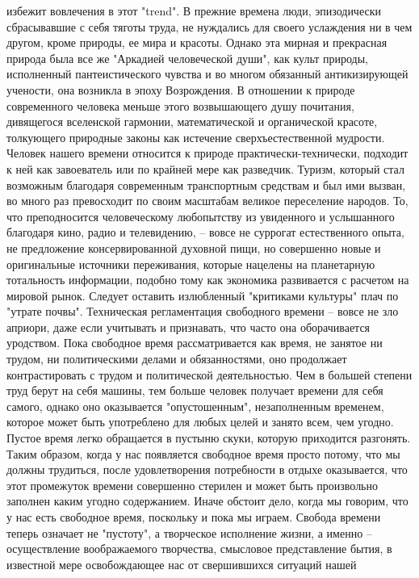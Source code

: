 \documentclass[12pt]{article}
\begin{document}
избежит вовлечения в этот "trend". В прежние времена люди, эпизодически сбрасывавшие с себя тяготы труда,
не нуждались для своего услаждения ни в чем другом, кроме природы, ее мира и красоты. Однако эта мирная и
прекрасная  природа  была  все  же  "Аркадией  человеческой  души",  как  культ  природы,  исполненный
пантеистического  чувства  и  во  многом  обязанный  антикизирующей  учености,  она  возникла  в  эпоху
Возрождения. В отношении к природе современного человека меньше этого возвышающего душу почитания,
дивящегося вселенской гармонии, математической и органической красоте, толкующего природные законы как
истечение  сверхъестественной  мудрости.  Человек  нашего  времени  относится  к  природе  практически-технически,  подходит  к  ней  как  завоеватель  или  по  крайней  мере  как  разведчик.  Туризм,  который  стал
возможным благодаря современным транспортным средствам и был ими вызван, во много раз превосходит по
своим  масштабам  великое  переселение  народов.  То,  что  преподносится  человеческому  любопытству  из
увиденного и услышанного благодаря кино, радио и телевидению, -- вовсе не суррогат естественного опыта, не
предложение  консервированной  духовной  пищи,  но  совершенно  новые  и  оригинальные  источники
переживания,  которые  нацелены  на  планетарную  тотальность  информации,  подобно  тому  как  экономика
развивается с расчетом на мировой рынок. Следует оставить излюбленный "критиками культуры" плач по
"утрате почвы". Техническая регламентация свободного времени -- вовсе не зло априори, даже если учитывать и
признавать, что часто она оборачивается уродством. Пока свободное время рассматривается как время, не
занятое ни трудом, ни политическими делами и обязанностями, оно продолжает контрастировать с трудом и
политической деятельностью. Чем в большей степени труд берут на себя машины, тем больше человек получает
времени для себя самого, однако оно оказывается "опустошенным", незаполненным временем, которое может
быть употреблено для любых целей и занято всем, чем угодно. Пустое время легко обращается в пустыню
скуки, которую приходится разгонять. Таким образом, когда у нас появляется свободное время просто потому,
что мы должны трудиться, после удовлетворения потребности в отдыхе оказывается, что этот промежуток
времени совершенно стерилен и может быть произвольно заполнен каким угодно содержанием. Иначе обстоит
дело, когда мы говорим, что у нас есть свободное время, поскольку и пока мы играем. Свобода времени теперь
означает не "пустоту", а творческое исполнение жизни, а именно -- осуществление воображаемого творчества,
смысловое представление бытия, в известной мере освобождающее нас от свершившихся ситуаций нашей
\end{document}
